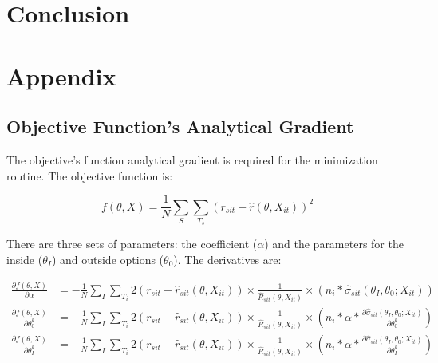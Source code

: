 \documentclass[11.5pt]{article}
\begin{document}









\section{Conclusion}

\newpage

\section{Appendix}

\subsection{Objective Function's Analytical Gradient}

The objective's function analytical gradient is required for the minimization routine. The objective function is:

\[f(\theta,X)= \frac{1}{N} \sum_S \sum_{T_s} (r_{sit}-\hat r(\theta,X_{it}))^2\]

There are three sets of parameters: the coefficient ($\alpha$) and the parameters for the inside ($\theta_I$) and outside options ($\theta_0$). The derivatives are:

\begin{align*}
    \frac{\partial f(\theta,X)}{\partial \alpha} &= -\frac{1}{N}\sum_I \sum_{T_i} 2(r_{sit} - \hat r_{sit}(\theta, X_{it})) \times \frac{1}{\hat R_{sit}(\theta,X_{it})}\times (n_i *  \hat \sigma_{sit}(\theta_I, \theta_0; X_{it}))\\
    \frac{\partial f(\theta,X)}{\partial \theta_0^k} & = -\frac{1}{N}\sum_I \sum_{T_i} 2(r_{sit} - \hat r_{sit}(\theta, X_{it}))  \times \frac{1}{\hat R_{sit}(\theta,X_{it})}\times  \left(n_i * \alpha *   \frac{\partial \hat\sigma_{sit}(\theta_I, \theta_0; X_{it})}{\partial \theta_0^k}\right) \\
    \frac{\partial f(\theta,X)}{\partial \theta_I^k} & = -\frac{1}{N}\sum_I \sum_{T_i} 2(r_{sit} - \hat r_{sit}(\theta, X_{it}))  \times \frac{1}{\hat R_{sit}(\theta,X_{it})}\times  \left(n_i * \alpha *   \frac{\partial \hat\sigma_{sit}(\theta_I, \theta_0; X_{it})}{\partial \theta_I^k}\right) 
\end{align*}
\end{document}

